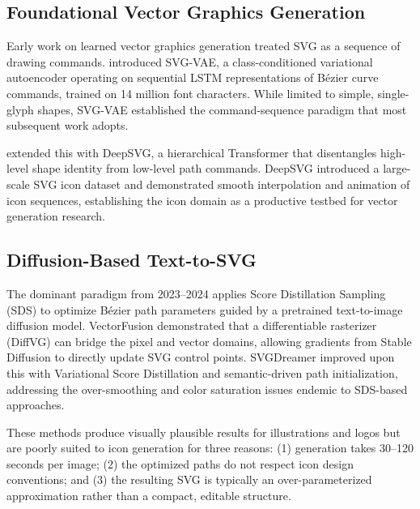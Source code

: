 
\subsection{Foundational Vector Graphics Generation}

Early work on learned vector graphics generation treated SVG as a sequence of
drawing commands. \citet{lopes2019svgvae} introduced SVG-VAE, a class-conditioned
variational autoencoder operating on sequential LSTM representations of Bézier
curve commands, trained on 14 million font characters. While limited to simple,
single-glyph shapes, SVG-VAE established the command-sequence paradigm that
most subsequent work adopts.

\citet{carlier2020deepsvg} extended this with DeepSVG, a hierarchical Transformer
that disentangles high-level shape identity from low-level path commands. DeepSVG
introduced a large-scale SVG icon dataset and demonstrated smooth interpolation
and animation of icon sequences, establishing the icon domain as a productive
testbed for vector generation research.

\subsection{Diffusion-Based Text-to-SVG}

The dominant paradigm from 2023--2024 applies Score Distillation Sampling (SDS)
to optimize Bézier path parameters guided by a pretrained text-to-image diffusion
model. VectorFusion \citep{jain2023vectorfusion} demonstrated that a differentiable
rasterizer (DiffVG) can bridge the pixel and vector domains, allowing gradients
from Stable Diffusion to directly update SVG control points. SVGDreamer
\citep{xing2024svgdreamer} improved upon this with Variational Score Distillation
and semantic-driven path initialization, addressing the over-smoothing and
color saturation issues endemic to SDS-based approaches.

These methods produce visually plausible results for illustrations and logos but
are poorly suited to icon generation for three reasons: (1) generation takes
30--120 seconds per image; (2) the optimized paths do not respect icon design
conventions; and (3) the resulting SVG is typically an over-parameterized
approximation rather than a compact, editable structure.

